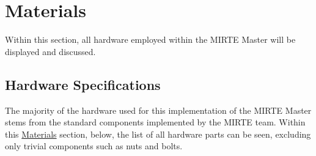 \section{Materials}

Within this section, all hardware employed within the MIRTE Master will be displayed and discussed.

\subsection{Hardware Specifications}

The majority of the hardware used for this implementation of the MIRTE Master stems from the standard components implemented by the MIRTE team. Within this \href{https://matt-rbt.github.io/Lab-Cleanup-Robot-using-the-Mirte-Master-Platform/materials/}{Materials} section, below, the list of all hardware parts can be seen, excluding only trivial components such as nuts and bolts.

